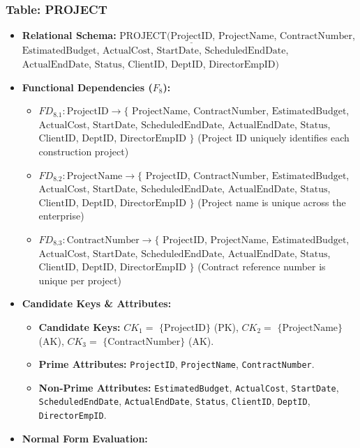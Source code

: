\documentclass[a4paper,12pt]{report}
\begin{document}
\subsubsection{Table: PROJECT}\label{table-project}

\begin{itemize}
\item
  \textbf{Relational Schema:} \(\text{PROJECT}(\underline{\text{ProjectID}}\), \(\text{ProjectName}\), \(\text{ContractNumber}\), \(\text{EstimatedBudget}\), \(\text{ActualCost}\), \(\text{StartDate}\), \(\text{ScheduledEndDate}\), \(\text{ActualEndDate}\), \(\text{Status}\), \(\text{ClientID}\), \(\text{DeptID}\), \(\text{DirectorEmpID})\)
\item
  \textbf{Functional Dependencies (\(F_{8}\)):}

  \begin{itemize}
  \item
    \(FD_{8.1}: \text{ProjectID} \rightarrow \{\) \(\text{ProjectName}\), \(\text{ContractNumber}\), \(\text{EstimatedBudget}\), \(\text{ActualCost}\), \(\text{StartDate}\), \(\text{ScheduledEndDate}\), \(\text{ActualEndDate}\), \(\text{Status}\), \(\text{ClientID}\), \(\text{DeptID}\), \(\text{DirectorEmpID}\) \(\}\) (Project ID uniquely identifies each construction project)
  \item
    \(FD_{8.2}: \text{ProjectName} \rightarrow \{\) \(\text{ProjectID}\), \(\text{ContractNumber}\), \(\text{EstimatedBudget}\), \(\text{ActualCost}\), \(\text{StartDate}\), \(\text{ScheduledEndDate}\), \(\text{ActualEndDate}\), \(\text{Status}\), \(\text{ClientID}\), \(\text{DeptID}\), \(\text{DirectorEmpID}\) \(\}\) (Project name is unique across the enterprise)
  \item
    \(FD_{8.3}: \text{ContractNumber} \rightarrow \{\) \(\text{ProjectID}\), \(\text{ProjectName}\), \(\text{EstimatedBudget}\), \(\text{ActualCost}\), \(\text{StartDate}\), \(\text{ScheduledEndDate}\), \(\text{ActualEndDate}\), \(\text{Status}\), \(\text{ClientID}\), \(\text{DeptID}\), \(\text{DirectorEmpID}\) \(\}\) (Contract reference number is unique per project)
  \end{itemize}
\item
  \textbf{Candidate Keys \& Attributes:}

  \begin{itemize}
  \item
    \textbf{Candidate Keys:} \(CK_{1} =\) \(\{\text{ProjectID}\}\) (PK), \(CK_{2} =\) \(\{\text{ProjectName}\}\) (AK), \(CK_{3} =\) \(\{\text{ContractNumber}\}\) (AK).
  \item
    \textbf{Prime Attributes:} \texttt{ProjectID}, \texttt{ProjectName}, \texttt{ContractNumber}.
  \item
    \textbf{Non-Prime Attributes:} \texttt{EstimatedBudget}, \texttt{ActualCost}, \texttt{StartDate}, \texttt{ScheduledEndDate}, \texttt{ActualEndDate}, \texttt{Status}, \texttt{ClientID}, \texttt{DeptID}, \texttt{DirectorEmpID}.
  \end{itemize}
\item
  \textbf{Normal Form Evaluation:}


\end{itemize}
\end{document}
